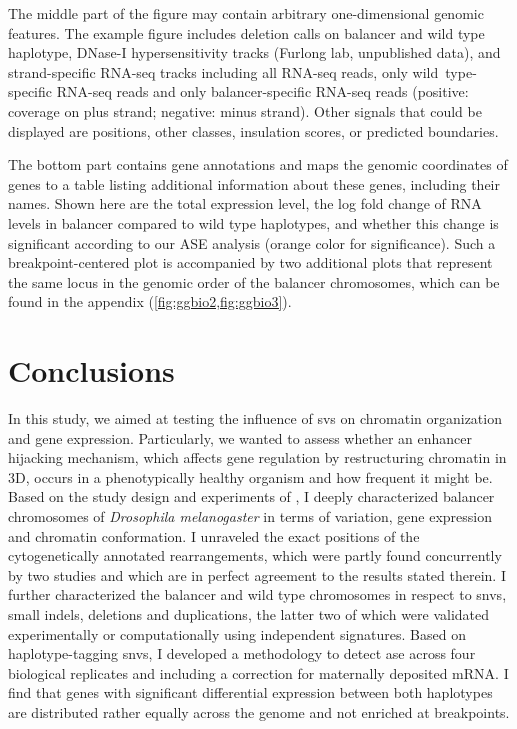 The middle part of the figure may contain arbitrary one-dimensional genomic
features. The example figure includes  deletion calls on balancer and
wild type haplotype,  DNase-I hypersensitivity tracks (Furlong lab,
unpublished data), and strand-specific RNA-seq tracks including  all
RNA-seq reads, only  wild\ type-specific RNA-seq reads and only
 balancer-specific RNA-seq reads (positive: coverage on plus strand;
negative: minus strand). Other signals that could be displayed
are \snv positions, other \sv classes, insulation scores, or predicted
\tad boundaries.

The bottom part contains  gene annotations and maps the
genomic coordinates of genes to a table listing additional information about
these genes, including their names. Shown here are the  total
expression level, the  log fold change of RNA levels in balancer
compared to wild type haplotypes, and whether this change is significant
according to our ASE analysis (orange color for significance).
Such a breakpoint-centered plot is accompanied by two additional
plots that represent the same locus in the genomic order of the balancer
chromosomes, which can be found in the appendix (\cref{fig:ggbio2,fig:ggbio3}).







\section{Conclusions}
\label{sec:balancer_concl}

In this study, we aimed at testing the influence of \acp{sv} on chromatin
organization and gene expression. Particularly, we wanted to assess whether an
enhancer hijacking mechanism, which affects gene regulation by restructuring
chromatin in 3D, occurs in a phenotypically healthy organism and how frequent it
might be. Based on the study design and experiments of \yad, I deeply
characterized balancer chromosomes of \textit{Drosophila melanogaster} in terms
of variation, gene expression and chromatin conformation. I unraveled the exact
positions of the cytogenetically annotated rearrangements, which were partly
found concurrently by two studies \citep{Miller2016,Miller2018} and which are in
perfect agreement to the results stated therein. I further characterized the
balancer and wild type chromosomes in respect to \acp{snv}, small indels,
deletions and duplications, the latter two of which were validated
experimentally or computationally using independent signatures. Based on
haplotype-tagging \acp{snv}, I developed a methodology to detect \acl{ase}
across four biological replicates and including a correction for maternally
deposited mRNA. I find that genes with significant differential expression
between both haplotypes are distributed rather equally across the genome and
not enriched at breakpoints.

